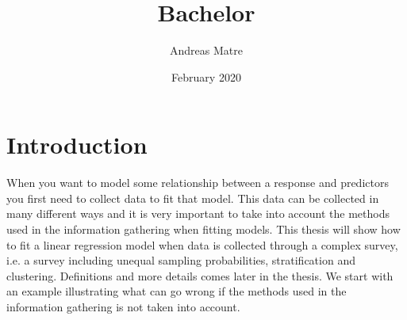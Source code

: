 \documentclass{article}
\title{Bachelor}
\author{Andreas Matre}
\date{February 2020}
\begin{document}
\newtheorem{definition}{Definition}[subsection]
\newtheorem{theorem}{Theorem}
\newtheorem{example}{Example}[section]


\maketitle

\tableofcontents

\section{Introduction}

When you want to model some relationship between a response and predictors you
first need to collect data to fit that model. This data can be collected in many
different ways and it is very important to take into account the methods used in
the information gathering when fitting models. This thesis will show how to fit
a linear regression model when data is collected through a complex survey, i.e.
a survey including unequal sampling probabilities, stratification and
clustering. Definitions and more details comes later in the thesis. We start
with an example illustrating what can go wrong if the methods used in the
information gathering is not taken into account.
\end{document}
